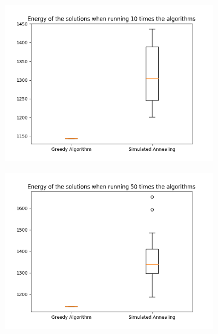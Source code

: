 \documentclass[14pt]
{article}
\begin{document}
\begin{figure}[H]
\centering
\begin{subfigure}{0.32\textwidth}
\centering
\includegraphics[width = \textwidth]{img/E50_10.png}
\end{subfigure}
\begin{subfigure}{0.32\textwidth}
\centering
\includegraphics[width = \textwidth]{img/E50_50.png}
\end{subfigure}
\begin{subfigure}{0.32\textwidth}
\centering

\end{subfigure}
\end{figure}
\end{document}
